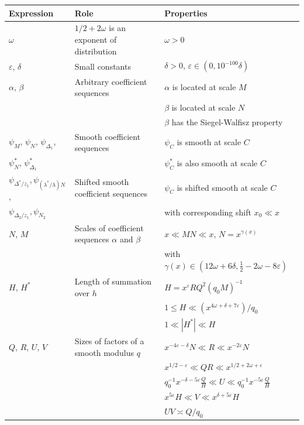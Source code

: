 \documentclass{amsart}
\numberwithin{equation}{section}
\begin{document}
\begin{center}
  \begin{tabular}{ | l | l | l |}
    \hline
    Expression & Role  & Properties \\ \hline
    $\omega$ & $1/2+2\omega$ is an exponent of distribution & $\omega>0$ \\ \hline
    $\varepsilon$, $\delta$ & Small constants & $\delta>0$, $\varepsilon \in (0,10^{-100}\delta)$ \\ \hline
    $\alpha$, $\beta$ & Arbitrary coefficient sequences & $\alpha$ is located at scale $M$ \\ & & $\beta$ is located at scale $N$ \\ & & $\beta$ has the Siegel-Walfisz property
    \\ \hline
        $\psi_M$, $\psi_N$, $\psi_{\Delta_1}$, & Smooth coefficient sequences & $\psi_C$ is smooth at scale $C$ \\  $\psi_N^*$, $\psi_{\Delta_1}^*$  & &  $\psi_C^*$ is also smooth at scale $C$
       \\ \hline
       $\psi_{\Delta^*/z_1 },  \psi_{(\lambda^*/\lambda )N}$, & Shifted smooth coefficient sequences & $\psi_C$ is shifted smooth at scale $C$ \\ $\psi_{\Delta_2/z_1}, \psi_{N_2}$ & &  with corresponding shift $x_0 \ll x$
        \\ \hline
    $N$, $M$ & Scales of coefficient sequences $\alpha$ and $\beta$ & $x \ll MN \ll x$, $N= x^{\gamma(x)}$ \\ & &  with $\gamma(x)  \in (12\omega+6\delta,\frac{1}{2}-2\omega-8\varepsilon)$ \\ \hline
     $H$, $H^*$ & Length of summation over $h$& $H=x^\varepsilon RQ^2 (q_0 M)^{-1}$ 
  \\ & &   
     $1 \leq H \ll (x^{4\omega + \delta+7\varepsilon})/q_0$
 \\ & & $1 \ll |H^*| \ll H$
  \\ \hline
    $Q$, $R$, $U$, $V$ & Sizes of factors of a smooth modulus $q$  & $x^{-4\varepsilon-\delta}N \ll R \ll x^{-2\varepsilon}N$\\ & &
$x^{1/2-\varepsilon} \ll QR \ll x^{1/2+2\omega+\varepsilon}$\\ & &
$q_0^{-1} x^{-\delta-5\varepsilon}\frac{Q}{H} \ll U \ll q_0^{-1}x^{-5\varepsilon} \frac{Q}{H}$\\ & &
 $x^{5\varepsilon}H \ll V \ll x^{\delta+5\varepsilon}H$\\ & &  
 $UV \asymp Q/q_0$ 
 \\ \hline 

\end{tabular}
\end{center}
\end{document}
